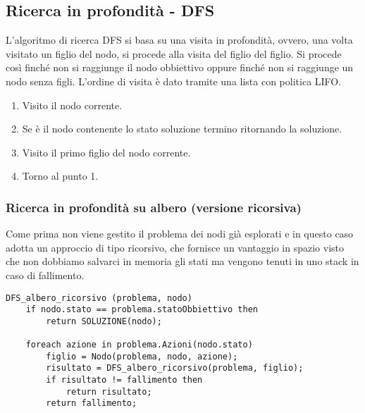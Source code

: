 \subsection{Ricerca in profondit\`a - DFS}
L'algoritmo di ricerca DFS si basa su una visita in profondit\`a, ovvero, una volta visitato
un figlio del nodo, si procede alla visita del figlio del figlio. Si procede cos\`i finch\'e
non si raggiunge il nodo obbiettivo oppure finch\'e non si raggiunge un nodo senza figli.
L'ordine di visita \`e dato  tramite una lista con politica LIFO.
\begin{enumerate}
	\item Visito il nodo corrente.
	\item Se \`e il nodo contenente lo stato soluzione termino ritornando la soluzione.
	\item Visito il primo figlio del nodo corrente.
	\item Torno al punto 1.
\end{enumerate}

\subsubsection{Ricerca in profondit\`a su albero (versione ricorsiva)}
Come prima non viene gestito il problema dei nodi gi\`a esplorati e in questo caso adotta un
approccio di tipo ricorsivo, che fornisce un vantaggio in spazio visto che non dobbiamo
salvarci in memoria gli stati ma vengono tenuti in uno stack in caso di fallimento.
\begin{lstlisting}[style=pseudo-style]
DFS_albero_ricorsivo (problema, nodo)
	if nodo.stato == problema.statoObbiettivo then
		return SOLUZIONE(nodo);
	
	foreach azione in problema.Azioni(nodo.stato)
		figlio = Nodo(problema, nodo, azione);
		risultato = DFS_albero_ricorsivo(problema, figlio);
		if risultato != fallimento then
			return risultato;
		return fallimento;
\end{lstlisting}

